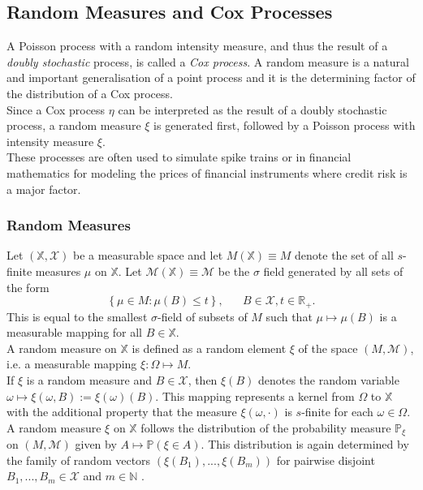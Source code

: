 \subsection{Random Measures and Cox Processes}
A Poisson process with a random intensity measure, and thus the result of a \textit{doubly stochastic} process, is called a \textit{Cox process}. A random measure is a natural and important generalisation of a point process and it is the determining factor of the distribution of a Cox process. \\
Since a Cox process $\eta$ can be interpreted as the result of a doubly stochastic process, a random measure $\xi$ is generated first, followed by a Poisson process with intensity measure $\xi$. \\
These processes are often used to simulate spike trains or in financial mathematics for modeling the prices of financial instruments where credit risk is a major factor.
\subsubsection{Random Measures}
Let $\left(\mathbb{X}, \mathcal{X}\right)$ be a measurable space and let $M\left(\mathbb{X}\right)\equiv M$ denote the set of all $s$-finite measures $\mu$ on $\mathbb{X}$. Let $\mathcal{M}\left(\mathbb{X}\right)\equiv \mathcal{M}$ be the $\sigma$ field generated by all sets of the form
\begin{equation*}
    \left\lbrace\mu\in M:\mu(B)\leq t\right\rbrace, \hspace{20pt}B\in\mathcal{X}, t\in\mathbb{R}_{+}.
\end{equation*}
This is equal to the smallest $\sigma$-field of subsets of $M$ such that $\mu\mapsto\mu(B)$ is a measurable mapping for all $B\in\mathbb{X}$. \\
A random measure on $\mathbb{X}$ is defined as a random element $\xi$ of the space $\left(M,\mathcal{M}\right)$, i.e. a measurable mapping $\xi:\Omega\mapsto M$. \\
If $\xi$ is a random measure and $B\in\mathcal{X}$, then $\xi(B)$ denotes the random variable $\omega\mapsto\xi\left(\omega,B\right):=\xi\left(\omega\right)(B)$. This mapping represents a kernel from $\Omega$ to $\mathbb{X}$ with the additional property that the measure $\xi\left(\omega,\cdot\right)$ is $s$-finite for each $\omega\in\Omega$. \\
A random measure $\xi$ on $\mathbb{X}$ follows the distribution of the probability measure $\mathbb{P}_{\xi}$ on $\left(M,\mathcal{M}\right)$ given by $A\mapsto\mathbb{P}\left(\xi\in A\right)$. This distribution is again determined by the family of random vectors $\left(\xi\left(B_1\right),...,\xi\left(B_m\right)\right)$ for pairwise disjoint $B_1,...,B_m\in\mathcal{X}$ and $m\in\mathbb{N}$  \autocite[][127--128]{last2017lectures}.
